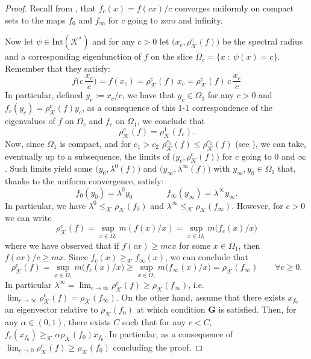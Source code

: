 \documentclass{article}
\newcommand{\cradius}{\rho_{\cone}}
\newcommand{\cone}{\mathcal{K}}
\newcommand{\interior}{\mathrm{Int}}
\newcommand{\cgeq}{\geq_{\cone}}
\newcommand{\cleq}{\leq_{\cone}}
\begin{document}
\begin{proof}
Recall from , that $f_c(x)=f(cx)/c$ converges uniformly on compact sets to the maps $f_0$ and $f_{\infty}$ for $c$ going to zero and infinity.
%

%
Now let $\psi \in \interior(\cone^*)$ and for any $c>0$ let $\big(x_c,\cradius^c(f)\big)$ be the spectral radius and a corresponding eigenfunction of $f$ on the slice $\Omega_c=\{x\::\;\psi(x)=c\}$. Remember that they satisfy:
    \begin{equation}
        f\Big(c \,\frac{x_c}{c}\Big)=f(x_c)=\cradius^c(f)\, x_c=\cradius^c(f) \,c\, \frac{x_c}{c}
    \end{equation}
    In particular, defined $y_c:=x_c/c$, we have that $y_c\in \Omega_1$ for any $c>0$ and $f_c(y_c)=\cradius^c(f) y_c$, as a consequence of this 1-1 correspondence of the eigenvalues of $f$ on $\Omega_c$ and $f_c$ on $\Omega_1$, we conclude that 
    \begin{equation}
    \cradius^c(f)=\cradius^1(f_c).
    \end{equation}
    Now, since $\Omega_1$ is compact, and for $c_1>c_2$ $\cradius^{c_1}(f)\leq \cradius^{c_2}(f)$ (see ), we can take, eventually up to a subsequence, the limits of $\big(y_c,\cradius^c(f)\big)$ for $c$ going to $0$ and $\infty$. Such limits yield some $\big(y_0,\lambda^0(f)\big)$ and $\big(y_{\infty},\lambda^{\infty}(f)\big)$ with $y_{\infty}, y_{0}\in \Omega_1$ that, thanks to the uniform convergence, satisfy:
    \begin{equation}
    f_0(y_0)=\lambda^0 y_0\qquad \qquad f_{\infty}(y_{\infty})=\lambda^{\infty} y_{\infty}.    
    \end{equation}
    In particular, we have $\lambda^0\cleq \cradius(f_0)$ and $\lambda^{\infty}\cleq \cradius(f_{\infty})$.
    However, for $c>0$ we can write 
    \begin{equation}
        \cradius^c(f)=\sup_{x\in\Omega_c} m(f(x)/x)= \sup_{x\in\Omega_1} m\big(f_c(x)/x\big)
    \end{equation}
    where we have observed that if $f(cx)\geq m cx$ for some $x\in \Omega_1$, then $f(cx)/c\geq m x$. Since $f_c(x)\cgeq f_{\infty}(x)$, we can conclude that 
    \begin{equation}
        \cradius^c(f)= \sup_{x\in\Omega_1} m\big(f_c(x)/x\big) \geq \sup_{x\in\Omega_1} m\big(f_{\infty}(x)/x\big)=\cradius(f_{\infty}) \qquad \forall c\geq 0.
    \end{equation}
 In particular $\lambda^{\infty}=\lim_{c\rightarrow \infty}\cradius^{c}(f)\geq \cradius(f_{\infty})$, i.e. $\lim_{c\rightarrow \infty}\cradius^{c}(f)=\cradius(f_{\infty})$. 
 On the other hand, assume that there exists $x_{f_0}$ an eigenvector relative to $\cradius(f_0)$ at which condition \textbf{G} is satisfied. Then, for any $\alpha\in(0,1)$, there exists $C$ such that for any $c<C$, $f_c(x_{f_0})\cgeq \alpha\cradius(f_0)x_{f_0}$. In particular, as a consequence of  $\lim_{c\rightarrow 0}\cradius^{c}(f)\geq \cradius(f_0)$ concluding the proof.    
\end{proof}
\end{document}
